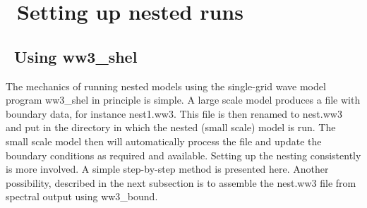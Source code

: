 \pagestyle{myheadings} \setcounter{page}{1} \setcounter{footnote}{0}

\section{~Setting up nested runs} \label{app:nest}
\newcounters 
\vssub
\subsection{~Using {\file ww3\_shel}}
\vssub

The mechanics of running nested models using the single-grid wave model
program {\file ww3\_shel} in principle is simple. A large scale model produces
a file with boundary data, for instance {\file nest1.ww3}. This file is then
renamed to {\file nest.ww3} and put in the directory in which the nested
(small scale) model is run. The small scale model then will automatically
process the file and update the boundary conditions as required and
available. Setting up the nesting consistently is more involved. A simple
step-by-step method is presented here. Another possibility, described in the next 
subsection is to assemble the {\file nest.ww3} file from spectral output using 
{\code ww3\_bound}.


